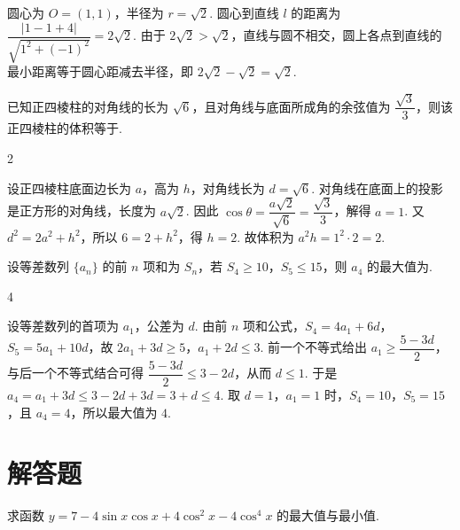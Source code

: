 \begin{solution}
圆心为 \(O=(1,1)\)，半径为 \(r=\sqrt2\). 圆心到直线 \(l\) 的距离为 \(\dfrac{\lvert1-1+4\rvert}{\sqrt{1^2+(-1)^2}}=2\sqrt2\). 由于 \(2\sqrt2>\sqrt2\)，直线与圆不相交，圆上各点到直线的最小距离等于圆心距减去半径，即 \(2\sqrt2-\sqrt2=\sqrt2\).
\end{solution}

\begin{problem}
已知正四棱柱的对角线的长为 \(\sqrt6\)，且对角线与底面所成角的余弦值为 \(\dfrac{\sqrt3}{3}\)，则该正四棱柱的体积等于\fillinblank{}.
\end{problem}

\begin{answer}
2
\end{answer}

\begin{solution}
设正四棱柱底面边长为 \(a\)，高为 \(h\)，对角线长为 \(d=\sqrt6\). 对角线在底面上的投影是正方形的对角线，长度为 \(a\sqrt2\). 因此 \(\cos\theta=\dfrac{a\sqrt2}{\sqrt6}=\dfrac{\sqrt3}{3}\)，解得 \(a=1\). 又 \(d^2=2a^2+h^2\)，所以 \(6=2+h^2\)，得 \(h=2\). 故体积为 \(a^2h=1^2\cdot2=2\).
\end{solution}

\begin{problem}
设等差数列 \(\{a_n\}\) 的前 \(n\) 项和为 \(S_n\)，若 \(S_4\geqslant10\)，\(S_5\leqslant15\)，则 \(a_4\) 的最大值为\fillinblank{}.
\end{problem}

\begin{answer}
4
\end{answer}

\begin{solution}
设等差数列的首项为 \(a_1\)，公差为 \(d\). 由前 \(n\) 项和公式，\(S_4=4a_1+6d\)，\(S_5=5a_1+10d\)，故
\(2a_1+3d\geqslant5\)，\(a_1+2d\leqslant3\). 前一个不等式给出 \(a_1\geqslant\dfrac{5-3d}{2}\)，与后一个不等式结合可得 \(\dfrac{5-3d}{2}\leqslant3-2d\)，从而 \(d\leqslant1\). 于是 \(a_4=a_1+3d\leqslant3-2d+3d=3+d\leqslant4\). 取 \(d=1\)，\(a_1=1\) 时，\(S_4=10\)，\(S_5=15\)，且 \(a_4=4\)，所以最大值为 \(4\).
\end{solution}

\section{解答题}

\begin{problem}
求函数 \(y=7-4\sin x\cos x+4\cos^2x-4\cos^4x\) 的最大值与最小值.
\end{problem}

